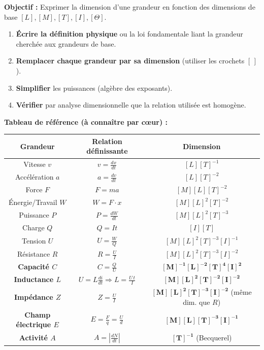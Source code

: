 \documentclass[11pt]{article}
\begin{document}
\begin{methode}
    \textbf{Objectif :} Exprimer la dimension d'une grandeur en fonction des dimensions de base $[L], [M], [T], [I], [\Theta]$.
    \begin{enumerate}
        \item \textbf{Écrire la définition physique} ou la loi fondamentale liant la grandeur cherchée aux grandeurs de base.
        \item \textbf{Remplacer chaque grandeur par sa dimension} (utiliser les crochets $[\,]$).
        \item \textbf{Simplifier} les puissances (algèbre des exposants).
        \item \textbf{Vérifier} par analyse dimensionnelle que la relation utilisée est homogène.
    \end{enumerate}
    \textbf{Tableau de référence (à connaître par cœur) :}
    \begin{center}
    \begin{tabular}{|c|c|c|}\hline
    \rowcolor{popblueL}
    \textbf{Grandeur} & \textbf{Relation définissante} & \textbf{Dimension} \\ \hline
    Vitesse $v$ & $v = \frac{dx}{dt}$ & $[L][T]^{-1}$ \\
    Accélération $a$ & $a = \frac{dv}{dt}$ & $[L][T]^{-2}$ \\
    Force $F$ & $F = ma$ & $[M][L][T]^{-2}$ \\
    Énergie/Travail $W$ & $W = F \cdot x$ & $[M][L]^2[T]^{-2}$ \\
    Puissance $P$ & $P = \frac{dW}{dt}$ & $[M][L]^2[T]^{-3}$ \\
    Charge $Q$ & $Q = It$ & $[I][T]$ \\
    Tension $U$ & $U = \frac{W}{Q}$ & $[M][L]^2[T]^{-3}[I]^{-1}$ \\
    Résistance $R$ & $R = \frac{U}{I}$ & $[M][L]^2[T]^{-3}[I]^{-2}$ \\
    \textbf{Capacité $C$} & $C = \frac{Q}{U}$ & $\mathbf{[M]^{-1}[L]^{-2}[T]^4[I]^2}$ \\
    \textbf{Inductance $L$} & $U = L\frac{di}{dt} \Rightarrow L = \frac{U\,t}{I}$ & $\mathbf{[M][L]^2[T]^{-2}[I]^{-2}}$ \\
    \textbf{Impédance $Z$} & $Z = \frac{U}{I}$ & $\mathbf{[M][L]^2[T]^{-3}[I]^{-2}}$ (même dim. que $R$) \\
    \textbf{Champ électrique $E$} & $E = \frac{F}{q} = \frac{U}{d}$ & $\mathbf{[M][L][T]^{-3}[I]^{-1}}$ \\
    \textbf{Activité $A$} & $A = \left|\frac{dN}{dt}\right|$ & $\mathbf{[T]^{-1}}$ (Becquerel) \\ \hline
    \end{tabular}
    \end{center}
\end{methode}
\end{document}
